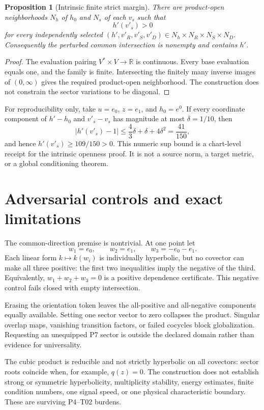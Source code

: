 \documentclass[11pt]{article}
\newtheorem{proposition}{Proposition}
\newcommand{\RR}{\mathbb R}
\begin{document}
\begin{proposition}[Intrinsic finite strict margin]
There are product-open neighborhoods \(N_h\) of \(h_0\) and \(N_s\) of each
\(v_s\) such that
\[
 h'(v'_s)>0
\]
for every independently selected
\((h',v'_R,v'_S,v'_D)\in N_h\times N_R\times N_S\times N_D\).
Consequently the perturbed common intersection is nonempty and contains
\(h'\).
\end{proposition}

\begin{proof}
The evaluation pairing \(V^*\times V\to\RR\) is continuous.  Every base
evaluation equals one, and the family is finite.  Intersecting the finitely
many inverse images of \((0,\infty)\) gives the required product-open
neighborhood.  The construction does not constrain the sector variations to
be diagonal.
\end{proof}

For reproducibility only, take
\(u=e_0\), \(z=e_1\), and \(h_0=e^0\).  If every coordinate component of
\(h'-h_0\) and \(v'_s-v_s\) has magnitude at most
\(\delta=1/10\), then
\[
 |h'(v'_s)-1|
 \le \frac43\delta+\delta+4\delta^2
 =\frac{41}{150},
\]
and hence \(h'(v'_s)\ge109/150>0\).  This numeric sup bound is a chart-level
receipt for the intrinsic openness proof.  It is not a source norm, a target
metric, or a global conditioning theorem.

\section{Adversarial controls and exact limitations}

The common-direction premise is nontrivial.  At one point let
\[
 w_1=e_0,\qquad w_2=e_1,\qquad w_3=-e_0-e_1.
\]
Each linear form \(k\mapsto k(w_i)\) is individually hyperbolic, but no
covector can make all three positive: the first two inequalities imply the
negative of the third.  Equivalently, \(w_1+w_2+w_3=0\) is a positive
dependence certificate.  This negative control fails closed with empty
intersection.

Erasing the orientation token leaves the all-positive and all-negative
components equally available.  Setting one sector vector to zero collapses
the product.  Singular overlap maps, vanishing transition factors, or failed
cocycles block globalization.  Requesting an unequipped P7 sector is outside
the declared domain rather than evidence for universality.

The cubic product is reducible and not strictly hyperbolic on all covectors:
sector roots coincide when, for example, \(q(z)=0\).  The construction does
not establish strong or symmetric hyperbolicity, multiplicity stability,
energy estimates, finite condition numbers, one signal speed, or one physical
characteristic boundary.  These are surviving P4--T02 burdens.
\end{document}
